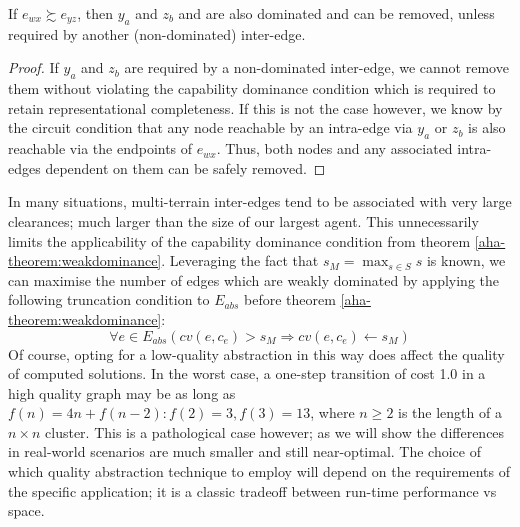 \begin{corollary}
If $e_{wx} \succsim e_{yz}$, then $y_{a}$ and $z_{b}$ and are also dominated and can be removed, unless required by another (non-dominated) inter-edge. 
\end{corollary}
\begin{proof}
If $y_{a}$ and $z_{b}$ are required by a non-dominated inter-edge, we cannot remove them without violating the capability dominance condition which is required to retain representational completeness. 
If this is not the case however, we know by the circuit condition that any node reachable by an intra-edge via $y_{a}$ or $z_{b}$ is also reachable via the endpoints of $e_{wx}$. 
Thus, both nodes and any associated intra-edges dependent on them can be safely removed.
\end{proof}
In many situations, multi-terrain inter-edges tend to be associated with very large clearances; much larger than the size of our largest agent.
This unnecessarily limits the applicability of the capability dominance condition from theorem \ref{aha-theorem:weakdominance}. 
Leveraging the fact that $s_M = \max_{s \in S} s$ is known, we can maximise the number of edges which are weakly dominated by applying the following truncation condition to $E_{abs}$ before theorem \ref{aha-theorem:weakdominance}:
$$
\forall e \in E_{abs} (cv(e, c_{e}) > s_M \Rightarrow cv(e, c_{e}) \leftarrow s_M) 
$$
Of course, opting for a low-quality abstraction in this way does affect the quality of computed solutions. 
In the worst case, a one-step transition of cost 1.0 in a high quality graph may be as long as $f(n) = 4n + f(n-2) : f(2) = 3, f(3) = 13$, where $n \geq 2$ is the length of a $n \times n$ cluster.
This is a pathological case however; as we will show the differences in real-world scenarios are much smaller and still near-optimal. 
The choice of which quality abstraction technique to employ will depend on the requirements of the specific application; it is a classic tradeoff between run-time performance vs space.
